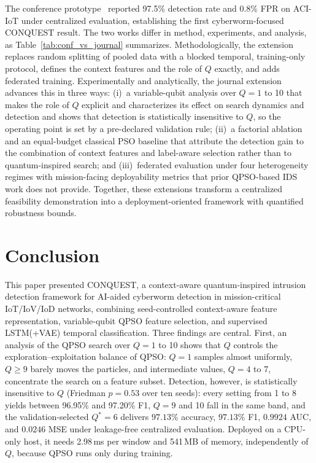 \documentclass[conference]{IEEEtran}
\begin{document}
The conference prototype~\cite{ajakweconquest} reported
97.5\% detection rate and 0.8\% FPR on ACI-IoT under
centralized evaluation, establishing the first
cyberworm-focused CONQUEST result. The
two works differ in method, experiments, and analysis,
as Table~\ref{tab:conf_vs_journal} summarizes. Methodologically, the extension
replaces random splitting of pooled data with a blocked temporal,
training-only protocol, defines the context features and the role
of $Q$ exactly, and adds federated training. Experimentally and
analytically, the journal extension
advances this in three ways: (i)~a
variable-qubit analysis over $Q=1$ to 10
that makes the role of $Q$ explicit and
characterizes its effect on search dynamics and detection
and shows that detection is statistically
insensitive to $Q$, so the operating point is set by a pre-declared
validation rule; (ii)~a factorial ablation
and an equal-budget classical PSO baseline that attribute the
detection gain to the combination of context features and
label-aware selection rather than to quantum-inspired search;
and (iii)~federated
evaluation under four heterogeneity regimes with
mission-facing deployability metrics that prior
QPSO-based IDS work does not provide. Together, these
extensions transform a centralized feasibility demonstration
into a deployment-oriented framework with quantified
robustness bounds.





\section{Conclusion}
\label{sec:conclusion}

This paper presented CONQUEST, a context-aware
quantum-inspired intrusion detection framework for AI-aided
cyberworm detection in mission-critical IoT/IoV/IoD networks,
combining seed-controlled context-aware feature representation,
variable-qubit QPSO feature selection, and supervised
LSTM(+VAE) temporal classification.
Three findings are central. First, an
analysis of the QPSO search over $Q=1$ to 10 shows that $Q$ controls
the exploration--exploitation balance of QPSO: $Q=1$ samples almost
uniformly, $Q\ge9$ barely moves the particles, and intermediate
values, $Q=4$ to 7, concentrate the search on a feature subset.
Detection, however, is statistically insensitive to
$Q$ (Friedman $p=0.53$ over ten seeds): every setting from 1 to 8
yields between 96.95\% and 97.20\% F1, $Q=9$ and 10 fall in the same
band, and the validation-selected $Q^{*}=6$
delivers $97.13\%$ accuracy, $97.13\%$ F1, $0.9924$ AUC, and
$0.0246$ MSE under leakage-free centralized evaluation. Deployed
on a CPU-only host, it needs 2.98\,ms per window and 541\,MB of
memory, independently of $Q$, because QPSO runs only during
training.
\end{document}
